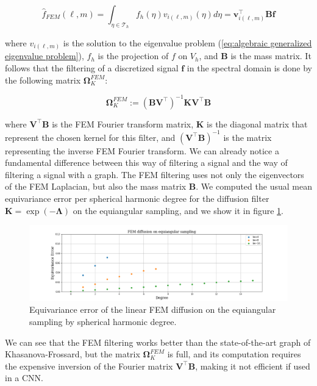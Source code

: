 \begin{equation}\label{eq:FEM fourier}
	\hat f_{FEM} (\ell, m) = \int_{\eta \in \mathcal T_h} f_h(\eta) v_{i(\ell, m)}(\eta) d\eta = \mathbf v_{i(\ell, m)}^\intercal \mathbf B \mathbf f
\end{equation}

where $ v_{i(\ell, m)}$ is the solution to the eigenvalue problem (\ref{eq:algebraic generalized eigenvalue problem}), $f_h$ is the projection of $f$ on $V_h$, and $\mathbf B$ is the mass matrix. It follows that the filtering of a discretized signal $\mathbf f$ in the spectral domain is done by the following matrix  $\mathbf \Omega_K^{FEM}$:

\begin{equation}\label{eq:FEM filtering}
	 \mathbf \Omega_K^{FEM} := (\mathbf B\mathbf V^\intercal)^{-1}\mathbf K\mathbf V^\intercal\mathbf B
\end{equation}

where $\mathbf V^\intercal\mathbf B$ is the FEM Fourier transform matrix, $\mathbf K$ is the diagonal matrix that represent the chosen kernel for this filter, and $(\mathbf V^\intercal\mathbf B)^{-1}$ is the matrix representing the inverse FEM Fourier transform. We can already notice a fundamental difference between this way of filtering a signal and the way of filtering a signal with a graph. The FEM filtering uses not only the eigenvectors of the FEM Laplacian, but also the mass matrix $\mathbf B$. We computed the usual mean equivariance error per spherical harmonic degree for the diffusion filter $\mathbf K=\exp(-\mathbf \Lambda)$ on the equiangular sampling, and we show it in figure \ref{fig:FEM diffusion}.
\begin{figure}[h]
	\centering
	\includegraphics[width=\textwidth]{../codes/06.Equivariance_error/FEMdiffusiononequiangularsampling.png}
	\caption{\label{fig:FEM diffusion}Equivariance error of the linear FEM diffusion on the equiangular sampling by spherical harmonic degree.}
\end{figure}
We can see that the FEM filtering works better than the state-of-the-art graph of Khasanova-Frossard, but the matrix $\mathbf \Omega_K^{FEM}$ is full, and its computation requires the expensive inversion of the Fourier matrix $\mathbf V^\intercal\mathbf B$, making it not efficient if used in a CNN. 
